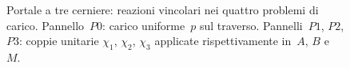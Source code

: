 \begin{figure}[htbp]
{\begin{tikzpicture}
				\end{tikzpicture}
			}
			\caption{Portale a tre cerniere: reazioni vincolari nei quattro problemi
				di carico. Pannello~$P0$: carico uniforme~$p$ sul traverso.
				Pannelli~$P1$, $P2$, $P3$: coppie unitarie $\chi_1$, $\chi_2$, $\chi_3$
				applicate rispettivamente in~$A$, $B$ e~$M$.}
			\label{fig:portale_reazioni:P0_1_2_3}
		\end{figure}
